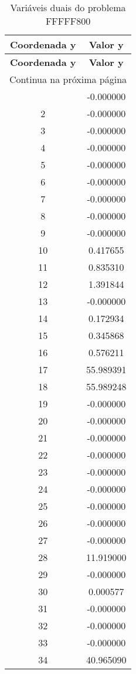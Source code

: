 \documentclass[12pt]{article}
\begin{document}
\begin{longtable}{@{}cc@{}}
\caption{Variáveis duais do problema FFFFF800} \\
\toprule
\textbf{Coordenada y} & \textbf{Valor y} \\
\midrule
\endfirsthead

\toprule
\textbf{Coordenada y} & \textbf{Valor y} \\
\midrule
\endhead

\midrule \multicolumn{2}{r}{{Continua na próxima página}} \\ \midrule
\endfoot

\bottomrule
\endlastfoot
1 & -0.000000 \\
2 & -0.000000 \\
3 & -0.000000 \\
4 & -0.000000 \\
5 & -0.000000 \\
6 & -0.000000 \\
7 & -0.000000 \\
8 & -0.000000 \\
9 & -0.000000 \\
10 & 0.417655 \\
11 & 0.835310 \\
12 & 1.391844 \\
13 & -0.000000 \\
14 & 0.172934 \\
15 & 0.345868 \\
16 & 0.576211 \\
17 & 55.989391 \\
18 & 55.989248 \\
19 & -0.000000 \\
20 & -0.000000 \\
21 & -0.000000 \\
22 & -0.000000 \\
23 & -0.000000 \\
24 & -0.000000 \\
25 & -0.000000 \\
26 & -0.000000 \\
27 & -0.000000 \\
28 & 11.919000 \\
29 & -0.000000 \\
30 & 0.000577 \\
31 & -0.000000 \\
32 & -0.000000 \\
33 & -0.000000 \\
34 & 40.965090 \\

\end{longtable}
\end{document}
